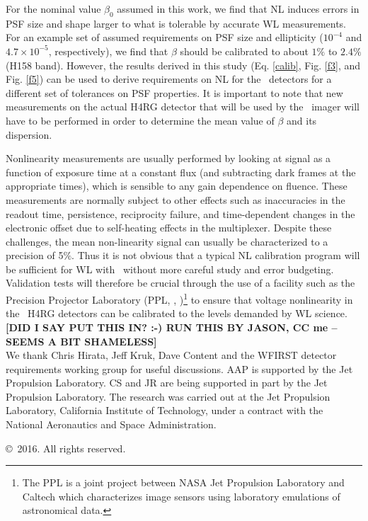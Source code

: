\documentclass[11pt,preprint,flushrt]{aastex}
\begin{document}
For the nominal value $\beta_0$ assumed in this work, we find that NL induces errors in PSF size and shape larger to what is tolerable by accurate WL measurements. For an example set of assumed requirements on PSF size and ellipticity ($10^{-4}$  and $4.7\times 10^{-5}$, respectively), we find that  $\beta$ should be calibrated to about $1\%$ to $2.4\%$ (H158 band). However, the results derived in this study (Eq. \ref{calib}, Fig. \ref{f3}, and Fig. \ref{f5}) can be used to derive requirements on NL for the \wfa\ detectors for a different set of tolerances on PSF properties. It is important to note that new measurements on the actual H4RG detector that will be used by the \wf\ imager will have to be performed in order to determine the mean value of $\beta$ and its dispersion.

Nonlinearity measurements are usually performed by looking at signal as a function of exposure time at a constant flux (and subtracting dark frames at the appropriate times), which is sensible to any gain dependence on fluence. These measurements are normally subject to other effects such as inaccuracies in the readout time, persistence, reciprocity failure, and time-dependent changes in the electronic offset due to self-heating effects in the multiplexer. Despite these challenges, the mean non-linearity signal can usually be characterized to a precision of 5$\%$. Thus it is not obvious that a typical NL calibration program will be sufficient for WL with \wf\ without more careful study and error budgeting.
Validation tests will therefore be crucial through the use of a facility such as the 
Precision Projector Laboratory (PPL, \citealt{seshadri13}, \citealt{shapiro13})\footnote{The PPL is a joint project between NASA Jet Propulsion Laboratory and Caltech which characterizes image sensors using laboratory emulations of astronomical data.} to ensure that voltage nonlinearity in the \wf\ H4RG detectors can be calibrated to the levels demanded by WL science. \textbf{[DID I SAY PUT THIS IN? :-)  RUN THIS BY JASON, CC me -- SEEMS A BIT SHAMELESS]}\\

We thank Chris Hirata, Jeff Kruk, Dave Content and the WFIRST detector requirements working group for useful discussions. AAP is supported by the Jet Propulsion Laboratory. CS and JR are being supported in part by the Jet Propulsion Laboratory. The research was carried out at the Jet Propulsion Laboratory, California Institute of Technology, under a contract with the National Aeronautics and Space Administration.

\copyright\ 2016. All rights reserved.





\acknowledgments


\end{document}
